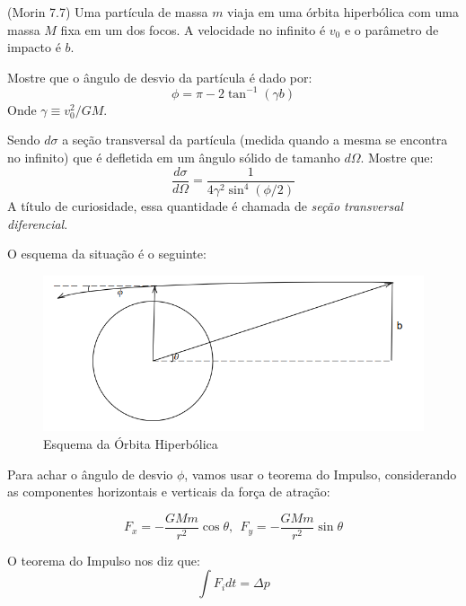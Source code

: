 \documentclass[11pt]{article}
\begin{document}
\begin{pproblem} (Morin 7.7) Uma partícula de massa \(m\) viaja em uma órbita hiperbólica com uma massa \(M\) fixa em um dos focos. A velocidade no infinito é \(v_0\) e o parâmetro de impacto é \(b\).
    \begin{alternativas}
    \item Mostre que o ângulo de desvio da partícula é dado por:
    \[
    \phi = \pi-2\tan^{-1}(\gamma b)
    \]
    Onde \(\gamma \equiv v_0^2/GM\).
    \item Sendo \(d\sigma\) a seção transversal da partícula (medida quando a mesma se encontra no infinito) que é defletida em um ângulo sólido de tamanho \(d\Omega\). Mostre que:
    \[
    \frac{d\sigma}{d\Omega} = \frac{1}{4\gamma^2\sin^4(\phi/2)}
    \] 
    A título de curiosidade, essa quantidade é chamada de \textit{seção transversal diferencial}.
    \end{alternativas}

    \begin{pssolution*}{}{}
        \begin{alternativas}
            \item O esquema da situação é o seguinte:
            
            \begin{figure}[H]
                \centering
                \includegraphics[width=0.87\linewidth]{imagens/orbita hiperbolica esquema 1.png}
                \caption{Esquema da Órbita Hiperbólica}
                \label{fig.1}
            \end{figure}

            Para achar o ângulo de desvio \(\phi\), vamos usar o teorema do Impulso, considerando as componentes horizontais e verticais da força de atração:

            \[F_x = -\frac{GMm}{r^2}\cos\theta, \ \ F_y = -\frac{GMm}{r^2}\sin\theta\]

            O teorema do Impulso nos diz que:
            \[\int F_i dt = \Delta p\]


\end{alternativas}
\end{pssolution*}
\end{pproblem}
\end{document}
